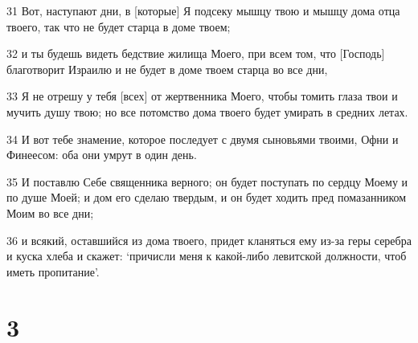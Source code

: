 \par 31 Вот, наступают дни, в [которые] Я подсеку мышцу твою и мышцу дома отца твоего, так что не будет старца в доме твоем;
\par 32 и ты будешь видеть бедствие жилища Моего, при всем том, что [Господь] благотворит Израилю и не будет в доме твоем старца во все дни,
\par 33 Я не отрешу у тебя [всех] от жертвенника Моего, чтобы томить глаза твои и мучить душу твою; но все потомство дома твоего будет умирать в средних летах.
\par 34 И вот тебе знамение, которое последует с двумя сыновьями твоими, Офни и Финеесом: оба они умрут в один день.
\par 35 И поставлю Себе священника верного; он будет поступать по сердцу Моему и по душе Моей; и дом его сделаю твердым, и он будет ходить пред помазанником Моим во все дни;
\par 36 и всякий, оставшийся из дома твоего, придет кланяться ему из-за геры серебра и куска хлеба и скажет: `причисли меня к какой-либо левитской должности, чтоб иметь пропитание'.

\chapter{3}

